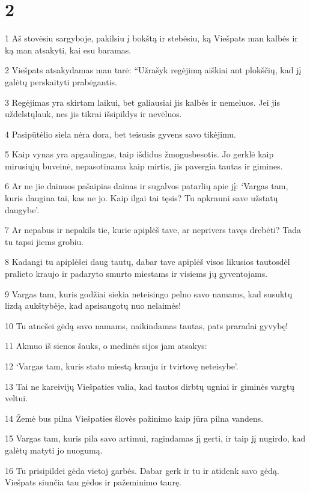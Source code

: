 \chapter{2}


\par 1 Aš stovėsiu sargyboje, pakilsiu į bokštą ir stebėsiu, ką Viešpats man kalbės ir ką man atsakyti, kai esu baramas. 
\par 2 Viešpats atsakydamas man tarė: “Užrašyk regėjimą aiškiai ant plokščių, kad jį galėtų perskaityti prabėgantis. 
\par 3 Regėjimas yra skirtam laikui, bet galiausiai jis kalbės ir nemeluos. Jei jis uždelstų­lauk, nes jis tikrai išsipildys ir nevėluos. 
\par 4 Pasipūtėlio siela nėra dora, bet teisusis gyvens savo tikėjimu. 
\par 5 Kaip vynas yra apgaulingas, taip išdidus žmogus­besotis. Jo gerklė kaip mirusiųjų buveinė, nepasotinama kaip mirtis, jis pavergia tautas ir gimines. 
\par 6 Ar ne jie dainuos pašaipias dainas ir sugalvos patarlių apie jį: ‘Vargas tam, kuris daugina tai, kas ne jo. Kaip ilgai tai tęsis? Tu apkrauni save užstatų daugybe’. 
\par 7 Ar nepabus ir nepakils tie, kurie apiplėš tave, ar neprivers tavęs drebėti? Tada tu tapsi jiems grobiu. 
\par 8 Kadangi tu apiplėšei daug tautų, dabar tave apiplėš visos likusios tautos­dėl pralieto kraujo ir padaryto smurto miestams ir visiems jų gyventojams. 
\par 9 Vargas tam, kuris godžiai siekia neteisingo pelno savo namams, kad susuktų lizdą aukštybėje, kad apsisaugotų nuo nelaimės! 
\par 10 Tu atnešei gėdą savo namams, naikindamas tautas, pats praradai gyvybę! 
\par 11 Akmuo iš sienos šauks, o medinės sijos jam atsakys: 
\par 12 ‘Vargas tam, kuris stato miestą krauju ir tvirtovę neteisybe’. 
\par 13 Tai ne kareivijų Viešpaties valia, kad tautos dirbtų ugniai ir giminės vargtų veltui. 
\par 14 Žemė bus pilna Viešpaties šlovės pažinimo kaip jūra pilna vandens. 
\par 15 Vargas tam, kuris pila savo artimui, ragindamas jį gerti, ir taip jį nugirdo, kad galėtų matyti jo nuogumą. 
\par 16 Tu prisipildei gėda vietoj garbės. Dabar gerk ir tu ir atidenk savo gėdą. Viešpats siunčia tau gėdos ir pažeminimo taurę. 

